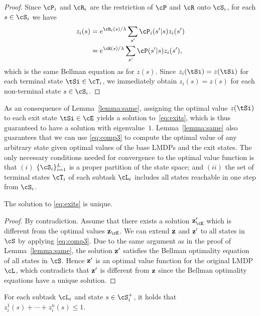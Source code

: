 \begin{proof}
Since $\cP_i$ and $\cR_i$ are the restriction of $\cP$ and $\cR$ onto $\cS_i$, for each $s\in\cS_i$ we have
\begin{align*}
    z_i(s) &= e^{\cR_i(s)/\lambda} \sum_{s'}\cP_i(s'|s)z_i(s') \\
    &= e^{\cR(s)/\lambda} \sum_{s'}\cP(s'|s)z_i(s'),
\end{align*}
which is %
 the same Bellman equation as for $z(s)$.
Since $z_i(\tSi)=z(\tSi)$ for each terminal state $\tSi\in\cT_i$, we immediately obtain $z_i(s)=z(s)$ for each non-terminal state $s\in\cS_i$.
\end{proof}
As an consequence of Lemma~\ref{lemma:same}, assigning the optimal value $z(\tSi)$ to each exit state $\tSi\in\cE$ yields a solution to~\eqref{eq:exits}, which is thus guaranteed to have a solution with eigenvalue~$1$. Lemma~\ref{lemma:same} also guarantees that we can use \eqref{eq:comp3} to compute the optimal value of any arbitrary state given optimal values of the base LMDPs and the exit states. The only necessary conditions needed for convergence to the optimal value function is that $(i)$ $\{\cS_i\}_{i=1}^L$ is a proper partition of the state space; and $(ii)$ the set of terminal states $\cT_i$ of each subtask $\cL_i$ includes all states reachable in one step from $\cS_i$.


\begin{lemma}
The solution to \eqref{eq:exits} is unique.
\end{lemma}

\begin{proof}
By contradiction. Assume that there exists a solution ${\bf z}_\cE'$ which is different from the optimal values ${\bf z}_\cE$. We can extend ${\bf z}$ and ${\bf z}'$ to all states in $\cS$ by applying \eqref{eq:comp3}. Due to the same argument as in the proof of Lemma~\ref{lemma:same}, the solution ${\bf z}'$ satisfies the Bellman optimality equation of all states in $\cS$. Hence ${\bf z}'$ is an optimal value function for the original LMDP $\cL$, which contradicts that ${\bf z}'$ is different from ${\bf z}$ since the Bellman optimality equations have a unique solution.
\end{proof}

\begin{lemma}
For each subtask $\cL_i$ and state $s\in\cS_i^+$, it holds that $z_i^1(s)+\cdots+z_i^n(s)\leq 1$.
\end{lemma}

